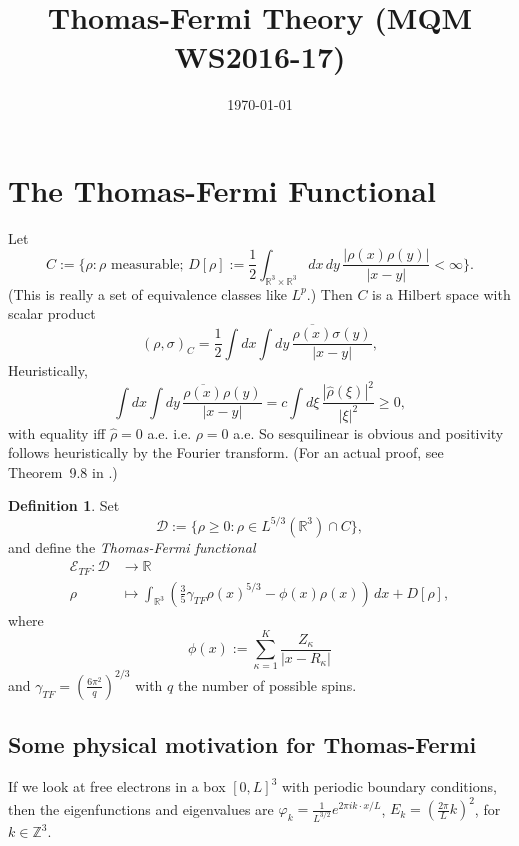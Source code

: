 \documentclass[11pt]{amsart}
\newcommand{\Z}{\mathbb{Z}}
\newcommand{\R}{\mathbb{R}}
\renewcommand{\hat}{\widehat}
\theoremstyle{definition}
\theoremstyle{definition}
\newtheorem{defn}{Definition}
\theoremstyle{definition}
\numberwithin{equation}{section}
\begin{document}
\title[]{Thomas-Fermi Theory (MQM WS2016-17)}
\date{\today}

\maketitle

\section{The Thomas-Fermi Functional}
Let 
\[
C:=\{\rho:\rho\text{ measurable};\,D[\rho]:=\frac{1}{2}\int_{\R^3\times\R^3}dx\,dy\,\frac{|\rho(x)\rho(y)|}{|x-y|}<\infty\}.
\] 
(This is really a set of equivalence classes like $L^p$.) Then $C$ is a Hilbert space with scalar product
\begin{equation}
(\rho,\sigma)_C=\frac{1}{2}\int dx\int dy\,\frac{\overline{\rho(x)}\sigma(y)}{|x-y|},
\end{equation}
Heuristically,
\[
\int dx\int dy\,\frac{\overline{\rho(x)}\rho(y)}{|x-y|}=c\int d\xi\,\frac{|\hat{\rho}(\xi)|^2}{|\xi|^2}\ge0,
\]
with equality iff $\hat{\rho}=0$ a.e. i.e. $\rho=0$ a.e. So sesquilinear is obvious and positivity follows heuristically by the Fourier transform. (For an actual proof, see Theorem~9.8 in \cite{lieb-loss}.)

\begin{defn}
Set
\begin{equation}
\mathcal{D}:=\{\rho\ge0:\rho\in L^{5/3}(\R^3)\cap C\},
\end{equation}
and define the \emph{Thomas-Fermi functional}
\begin{align}
\nonumber\mathcal{E}_{TF}:\mathcal{D}&\to\R\\
\rho&\mapsto\int_{\R^3}\left(\frac{3}{5}\gamma_{TF}\rho(x)^{5/3}-\phi(x)\rho(x)\right)\,dx+D[\rho],
\end{align}
where
\[
\phi(x):=\sum_{\kappa=1}^{K}\frac{Z_\kappa}{|x-R_\kappa|}
\]
and $\gamma_{TF}=\left(\frac{6\pi^2}{q}\right)^{2/3}$ with $q$ the number of possible spins.
\end{defn}

\subsection{Some physical motivation for Thomas-Fermi}

If we look at free electrons in a box $[0,L]^3$ with periodic boundary conditions, then the eigenfunctions and eigenvalues are $\varphi_k=\frac{1}{L^{3/2}}e^{2\pi ik\cdot x/L}$, $E_k=(\frac{2\pi}{L}k)^2$, for $k\in\Z^3$. 
\end{document}
